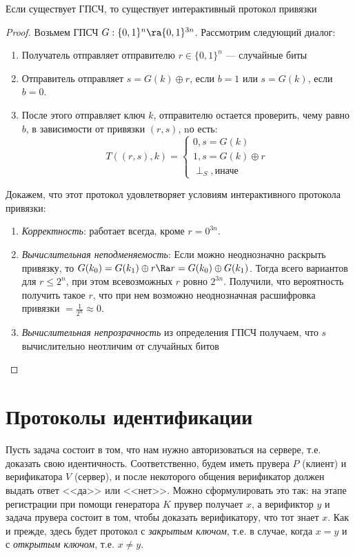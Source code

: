 \begin{proposition}
    Если существует ГПСЧ, то существует интерактивный протокол привязки
\end{proposition}
\begin{proof}
    Возьмем ГПСЧ \(G: \{0, 1\}^n \ra \{0, 1\}^{3n}\). Рассмотрим следующий диалог:
    \begin{enumerate}
        \item Получатель отправляет отправителю \(r \in \{0, 1\}^n\) --- случайные биты
        \item Отправитель отправляет \(s = G(k) \oplus r\), если \(b = 1\) или \(s = G(k)\), если \(b = 0\).
        \item После этого отправляет ключ \(k\), отправителю остается проверить, чему равно \(b\), в зависимости от привязки \((r, s)\), nо есть:
        \[T((r, s), k) = \begin{cases}
            0, s = G(k) \\
            1, s = G(k) \oplus r \\
            \perp_S, \text{иначе}
        \end{cases}\]
    \end{enumerate}

    Докажем, что этот протокол удовлетворяет условиям интерактивного протокола привязки:
    \begin{enumerate}
        \item \emph{Корректность}: работает всегда, кроме \(r = 0^{3n}\).
        \item \emph{Вычислительная неподменяемость}: Если можно неоднозначно раскрыть привязку, то \(G(k_0) = G(k_1) \oplus r \Ra r = G(k_0) \oplus G(k_1)\). Тогда всего вариантов для \(r \le 2^n\), при этом всевозможных \(r\) ровно \(2^{3n}\). Получили, что вероятность получить такое \(r\), что при нем возможно неоднозначная расшифровка привязки \(= \frac{1}{2^n} \approx 0\).
        \item \emph{Вычислительная непрозрачность} из определения ГПСЧ получаем, что \(s\) вычислительно неотличим от случайных битов
    \end{enumerate}
\end{proof}


\section{Протоколы идентификации}
Пусть задача состоит в том, что нам нужно авторизоваться на сервере, т.е. доказать свою идентичность. Соответственно, будем иметь прувера \(P\) (клиент) и верификатора \(V\) (сервер), и после некоторого общения верификатор должен выдать ответ <<да>> или <<нет>>. Можно сформулировать это так: на этапе регистрации при помощи генератора \(K\) прувер получает \(x\), а верификтор \(y\) и задача прувера состоит в том, чтобы доказать верификатору, что тот знает \(x\). Как и прежде, здесь будет протокол с \emph{закрытым ключом}, т.е. в случае, когда \(x = y\) и с \emph{открытым ключом}, т.е. \(x \ne y\).

